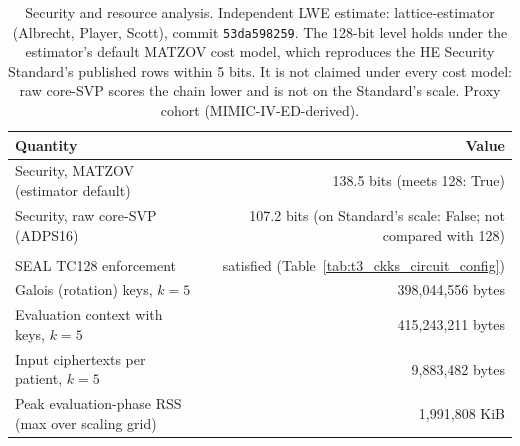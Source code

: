 \begin{table}[t]
\centering
\caption{Security and resource analysis. Independent LWE estimate: lattice-estimator (Albrecht, Player, Scott), commit \texttt{53da598259}. The 128-bit level holds under the estimator's default MATZOV cost model, which reproduces the HE Security Standard's published rows within 5 bits. It is not claimed under every cost model: raw core-SVP scores the chain lower and is not on the Standard's scale. Proxy cohort (MIMIC-IV-ED-derived).}
\label{tab:t8_security_resource}
\begin{tabular}{lr}
\toprule
Quantity & Value \\
\midrule
Security, MATZOV (estimator default) & 138.5 bits (meets 128: True) \\
Security, raw core-SVP (ADPS16) & 107.2 bits (on Standard's scale: False; not compared with 128) \\\\
SEAL TC128 enforcement & satisfied (Table~\ref{tab:t3_ckks_circuit_config}) \\
Galois (rotation) keys, $k=5$ & 398,044,556 bytes \\
Evaluation context with keys, $k=5$ & 415,243,211 bytes \\
Input ciphertexts per patient, $k=5$ & 9,883,482 bytes \\
Peak evaluation-phase RSS (max over scaling grid) & 1,991,808 KiB \\
\bottomrule
\end{tabular}
\end{table}
